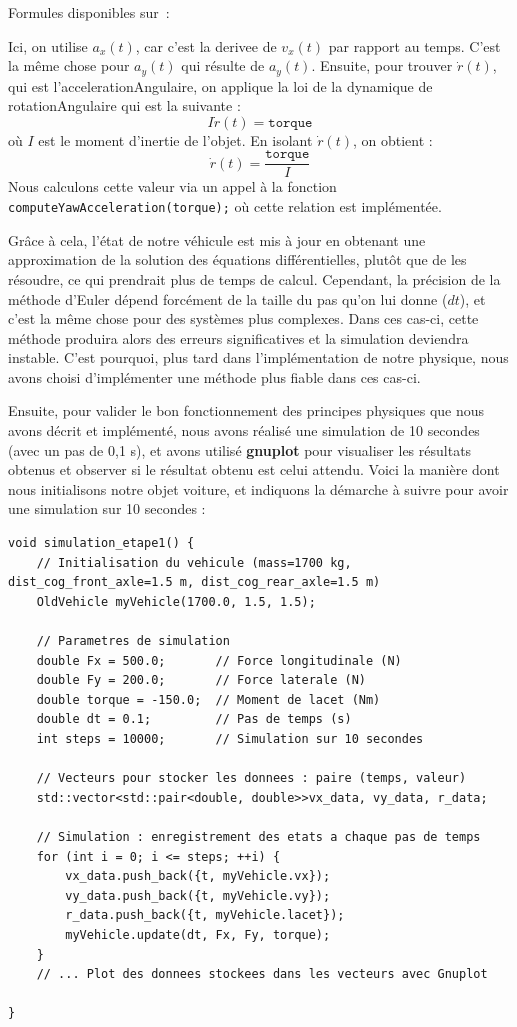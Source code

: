 \begin{center}
    Formules disponibles sur~\cite{euler_explicite}:
\end{center}

Ici, on utilise $a_x(t)$, car c'est la \gls{derivee} de $v_x(t)$ par rapport au temps.
C'est la même chose pour $a_y(t)$ qui résulte de $a_y(t)$.
Ensuite, pour trouver $\dot{r}(t)$, qui est l'\gls{accelerationAngulaire}, on applique la loi de la dynamique de \gls{rotationAngulaire} qui est la suivante :
$$I\dot{r}(t) = \texttt{torque}$$
où $I$ est le moment d'inertie de l'objet.
En isolant $\dot{r}(t)$, on obtient :
$$\dot{r}(t)= \frac{\texttt{torque}}{I}$$
Nous calculons cette valeur via un appel à la fonction \texttt{computeYawAcceleration(torque);} où cette relation est implémentée.

Grâce à cela, l'état de notre véhicule est mis à jour en obtenant une approximation de la solution des équations différentielles, plutôt que de les résoudre, ce qui prendrait plus de temps de calcul.
Cependant, la précision de la méthode d'Euler dépend forcément de la taille du pas qu'on lui donne ($dt$), et c'est la même chose pour des systèmes plus complexes.
Dans ces cas-ci, cette méthode produira alors des erreurs significatives et la simulation deviendra instable.
C'est pourquoi, plus tard dans l'implémentation de notre physique, nous avons choisi d'implémenter une méthode plus fiable dans ces cas-ci.

Ensuite, pour valider le bon fonctionnement des principes physiques que nous avons décrit et implémenté, nous avons réalisé une simulation de 10 secondes (avec un pas de 0,1 s), et avons utilisé \textbf{\gls{gnuplot}} pour visualiser les résultats obtenus et observer si le résultat obtenu est celui attendu. Voici la manière dont nous initialisons notre objet voiture, et indiquons la démarche à suivre pour avoir une simulation sur 10 secondes :

\begin{lstlisting}[style=CStyle,label={lst:void_simulation_etape1}]
void simulation_etape1() {
    // Initialisation du vehicule (mass=1700 kg, dist_cog_front_axle=1.5 m, dist_cog_rear_axle=1.5 m)
    OldVehicle myVehicle(1700.0, 1.5, 1.5);

    // Parametres de simulation
    double Fx = 500.0;       // Force longitudinale (N)
    double Fy = 200.0;       // Force laterale (N)
    double torque = -150.0;  // Moment de lacet (Nm)
    double dt = 0.1;         // Pas de temps (s)
    int steps = 10000;       // Simulation sur 10 secondes

    // Vecteurs pour stocker les donnees : paire (temps, valeur)
    std::vector<std::pair<double, double>>vx_data, vy_data, r_data;

    // Simulation : enregistrement des etats a chaque pas de temps
    for (int i = 0; i <= steps; ++i) {
        vx_data.push_back({t, myVehicle.vx});
        vy_data.push_back({t, myVehicle.vy});
        r_data.push_back({t, myVehicle.lacet});
        myVehicle.update(dt, Fx, Fy, torque);
    }
    // ... Plot des donnees stockees dans les vecteurs avec Gnuplot

}
\end{lstlisting}

